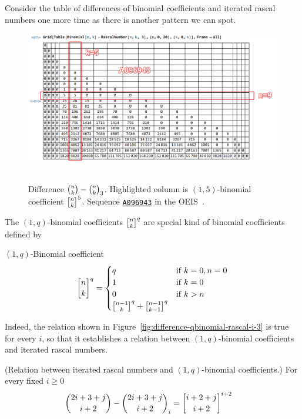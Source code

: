 ﻿Consider the table of differences of binomial coefficients and iterated rascal numbers one more time
as there is another pattern we can spot.
\begin{figure}[H]
    \centering
    \includegraphics[width=1\textwidth]{img/03_Difference_Binomial_Rascal_i_3_OneQBinomialCoefficients}
    ~\caption{Difference $\binom{n}{k}-\binom{n}{k}_{3}$.
    Highlighted column is $(1,5)$-binomial coefficient $\oneQBinomial{n}{k}{5}$.
    Sequence \href{https://oeis.org/A096943}{\texttt{A096943}} in the OEIS~\cite{sloane2004sixth}.}
    \label{fig:difference-qbinomial-rascal-i-3}
\end{figure}
The $(1,q)$-binomial coefficients $\oneQBinomial{n}{k}{q}$ are special kind of binomial coefficients defined by
\begin{definition}
    $(1,q)$-Binomial coefficient
    \begin{equation}
        \oneQBinomial{n}{k}{q} =
        \begin{cases}
            q & \mathrm{if} \; k=0, n=0 \\
            1 & \mathrm{if} \; k=0 \\
            0 & \mathrm{if} \; k > n \\
            \oneQBinomial{n-1}{k}{q} + \oneQBinomial{n-1}{k-1}{q}
        \end{cases}\label{eq:qbinomial-definition}
    \end{equation}
\end{definition}
Indeed, the relation shown in Figure~\eqref{fig:difference-qbinomial-rascal-i-3} is true for every $i$,
so that it establishes a relation between $(1,q)$-binomial coefficients and iterated rascal numbers.
\begin{proposition} (Relation between iterated rascal numbers and $(1,q)$-binomial coefficients.)
    For every fixed $i\geq0$
    \label{prop:row-column-difference-qbinomial}
    \begin{align*}
        \binom{2i+3+j}{i+2} - \rascalNumber{2i+3+j}{i+2}{i} &= \oneQBinomial{i+2+j}{i+2}{i+2}
    \end{align*}
\end{proposition}
